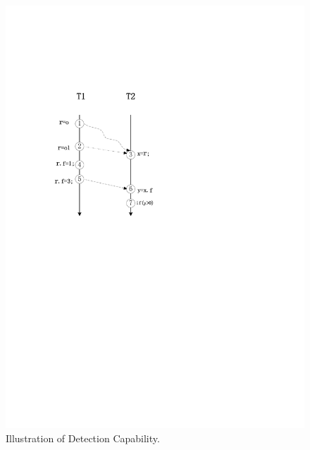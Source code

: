 \begin{figure}[htp]
\centering
\includegraphics[scale=0.45]{figs/Visio-discuss.pdf}
\caption{Illustration of Detection Capability.}\label{fig:discuss}
\end{figure}




